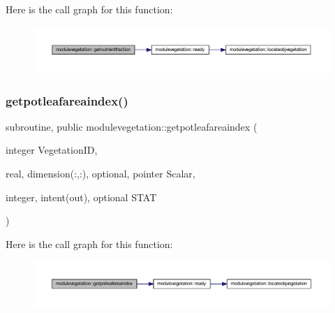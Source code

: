 Here is the call graph for this function\+:\nopagebreak
\begin{figure}[H]
\begin{center}
\leavevmode
\includegraphics[width=350pt]{namespacemodulevegetation_afcdcb6390a6a25bc7c5e5d70525ac36d_cgraph}
\end{center}
\end{figure}
\mbox{\label{namespacemodulevegetation_a135c6aa1fdf9824ab93f467c026a344f}} 
\subsubsection{\texorpdfstring{getpotleafareaindex()}{getpotleafareaindex()}}
{\footnotesize\ttfamily subroutine, public modulevegetation\+::getpotleafareaindex (\begin{DoxyParamCaption}\item[{integer}]{Vegetation\+ID,  }\item[{real, dimension(\+:,\+:), optional, pointer}]{Scalar,  }\item[{integer, intent(out), optional}]{S\+T\+AT }\end{DoxyParamCaption})}

Here is the call graph for this function\+:\nopagebreak
\begin{figure}[H]
\begin{center}
\leavevmode
\includegraphics[width=350pt]{namespacemodulevegetation_a135c6aa1fdf9824ab93f467c026a344f_cgraph}
\end{center}
\end{figure}
\mbox{\label{namespacemodulevegetation_a4eb34f9d9a6f4daecca56ea8f69b25b3}} 
